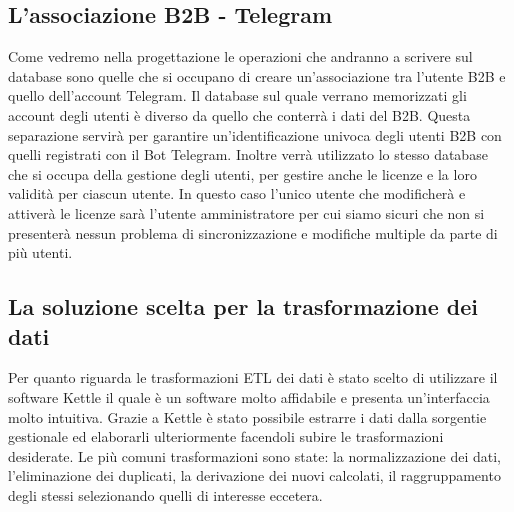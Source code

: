 \subsection{L'associazione B2B - Telegram}
Come vedremo nella progettazione le operazioni che andranno a scrivere sul database sono quelle che si occupano di creare un'associazione tra l'utente B2B e quello dell'account Telegram. Il database sul quale verrano memorizzati gli account degli utenti è diverso da quello che conterrà i dati del B2B. Questa separazione servirà per garantire un'identificazione univoca degli utenti B2B con quelli registrati con il Bot Telegram. Inoltre verrà utilizzato lo stesso database che si occupa della gestione degli utenti, per gestire anche le licenze e la loro validità per ciascun utente. In questo caso l'unico utente che modificherà e attiverà le licenze sarà l'utente amministratore per cui siamo sicuri che non si presenterà nessun problema di sincronizzazione e modifiche multiple da parte di più utenti. 

\subsection{La  soluzione scelta per la trasformazione dei dati}

Per quanto riguarda le trasformazioni ETL dei dati è stato scelto di utilizzare il software Kettle il quale è un software molto affidabile e presenta un'interfaccia molto intuitiva. Grazie a Kettle è stato possibile estrarre i dati dalla sorgentie gestionale ed elaborarli ulteriormente facendoli subire le trasformazioni desiderate. Le più comuni trasformazioni sono state: la normalizzazione dei dati, l'eliminazione dei duplicati, la derivazione dei nuovi calcolati, il raggruppamento degli stessi selezionando quelli di interesse eccetera. \\































